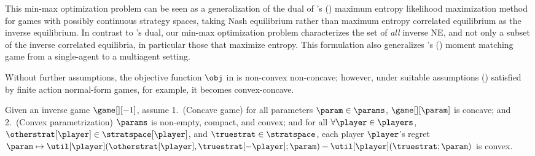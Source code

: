 
This min-max optimization problem can be seen as a generalization of the dual of \citeauthor{waugh2013computational}'s (\citeyear{waugh2013computational}) maximum entropy likelihood maximization method for games with possibly continuous strategy spaces, taking Nash equilibrium rather than maximum entropy correlated equilibrium as the inverse equilibrium. 
In contrast to \citeauthor{waugh2013computational}'s dual, our min-max optimization problem characterizes the set of \emph{all\/} inverse NE, and not only a subset of the inverse correlated equilibria, in particular those that maximize entropy.
This formulation also generalizes \citeauthor{swamy2021moments}'s (\citeyear{swamy2021moments}) moment matching game from a single-agent to a multiagent setting.
 

 


Without further assumptions, the objective function $\obj$ in  is non-convex non-concave; however, 
under suitable assumptions () satisfied by
finite action normal-form games, for example, it becomes convex-concave.

  

\begin{assumption}
\label{assum:concave_game}
    Given an inverse game $\game[][-1]$, assume 1.~(Concave game) for all parameters $\param \in \params$, $\game[][\param]$ is concave; and 
    2.~(Convex parametrization) $\params$ is non-empty, compact, and convex; and for all $\forall \player \in \players$, $\otherstrat[\player] \in \stratspace[\player]$, and $\truestrat \in \stratspace$, each player $\player$'s regret $\param \mapsto \util[\player] (\otherstrat[\player], \truestrat[-\player]; \param) - \util[\player] (\truestrat; \param)$ is convex.
\end{assumption}


